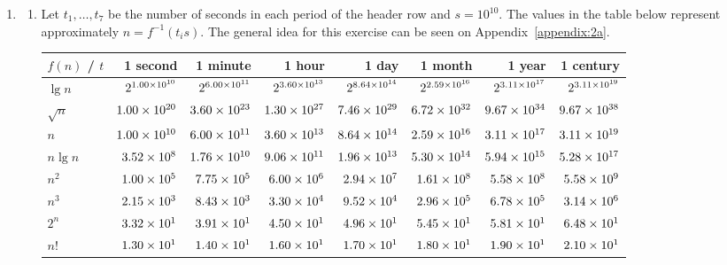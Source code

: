\documentclass[12pt]{article}
\begin{document}
\begin{enumerate}
  \item 
  \begin{enumerate}\label{ex:2a}
    \item Let $t_{1}, \dots, t_{7}$ be the number of seconds in each period of the header row and $s = 10^{10}$. The values in the table below represent approximately $n = f^{-1}(t_{i} s)$. The general idea for this exercise can be seen on Appendix~\ref{appendix:2a}.
    \begin{table}[htbp]
      \renewcommand{\arraystretch}{1.2}
      \setlength{\tabcolsep}{7pt}
      \centering
      \footnotesize
      \begin{tabular}{l*{7}{r}}
        \toprule
        $f(n)$ / $t$ & 1 second & 1 minute & 1 hour & 1 day & 1 month & 1 year & 1 century \\ \midrule
        $   \lg n$ & $2^{\num{1.00E+10}}$ & $2^{\num{6.00E+11}}$ & $2^{\num{3.60E+13}}$ & $2^{\num{8.64E+14}}$ & $2^{\num{2.59E+16}}$ & $2^{\num{3.11E+17}}$ & $2^{\num{3.11E+19}}$ \\
        $\sqrt{n}$ & $\num{1.00E+20}$ & $\num{3.60E+23}$ & $\num{1.30E+27}$ & $\num{7.46E+29}$ & $\num{6.72E+32}$ & $\num{9.67E+34}$ & $\num{9.67E+38}$ \\
        $       n$ & $\num{1.00E+10}$ & $\num{6.00E+11}$ & $\num{3.60E+13}$ & $\num{8.64E+14}$ & $\num{2.59E+16}$ & $\num{3.11E+17}$ & $\num{3.11E+19}$ \\
        $ n \lg n$ & $\num{3.52E+08}$ & $\num{1.76E+10}$ & $\num{9.06E+11}$ & $\num{1.96E+13}$ & $\num{5.30E+14}$ & $\num{5.94E+15}$ & $\num{5.28E+17}$ \\
        $   n^{2}$ & $\num{1.00E+05}$ & $\num{7.75E+05}$ & $\num{6.00E+06}$ & $\num{2.94E+07}$ & $\num{1.61E+08}$ & $\num{5.58E+08}$ & $\num{5.58E+09}$ \\
        $   n^{3}$ & $\num{2.15E+03}$ & $\num{8.43E+03}$ & $\num{3.30E+04}$ & $\num{9.52E+04}$ & $\num{2.96E+05}$ & $\num{6.78E+05}$ & $\num{3.14E+06}$ \\
        $   2^{n}$ & $\num{3.32E+01}$ & $\num{3.91E+01}$ & $\num{4.50E+01}$ & $\num{4.96E+01}$ & $\num{5.45E+01}$ & $\num{5.81E+01}$ & $\num{6.48E+01}$ \\
        $      n!$ & $\num{1.30E+01}$ & $\num{1.40E+01}$ & $\num{1.60E+01}$ & $\num{1.70E+01}$ & $\num{1.80E+01}$ & $\num{1.90E+01}$ & $\num{2.10E+01}$ \\
        \bottomrule
      \end{tabular}
    \end{table}
    

\end{enumerate}
\end{enumerate}
\end{document}
